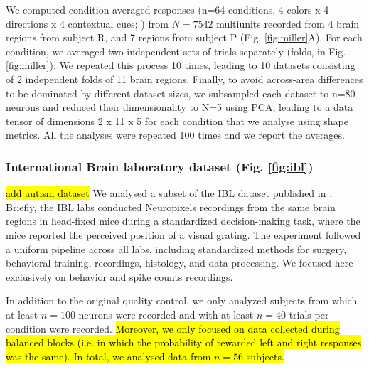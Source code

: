 We computed condition-averaged responses (n=64 conditions, 4 colors x 4 directions x 4 contextual cues; \cite{Siegel2015-cz}) from $N=7542$  multiunits recorded from 4 brain regions from subject R, and 7 regions from subject P (Fig. \ref{fig:miller}A). For each condition, we averaged two independent sets of trials separately (folds, in Fig. \ref{fig:miller}). We repeated this process 10 times, leading to 10 datasets consisting of 2 independent folds of 11 brain regions. Finally, to avoid across-area differences to be dominated by different dataset sizes, we subsampled each dataset to n=80 neurons and reduced their dimensionality to N=5 using PCA, leading to a data tensor of dimensions 2 x 11 x 5 for each condition that we analyse using shape metrics. All the analyses were repeated 100 times and we report the averages. 

\subsubsection{International Brain laboratory dataset (Fig. \ref{fig:ibl})}
\hl{add autism dataset}
We analysed a subset of the IBL dataset published in \cite{iblreproducibility}. Briefly, the IBL labs conducted Neuropixels recordings from the same brain regions in head-fixed mice during a standardized decision-making task, where the mice reported the perceived position of a visual grating. The experiment followed a uniform pipeline across all labs, including standardized methods for surgery, behavioral training, recordings, histology, and data processing. We focused here exclusively on behavior and spike counts recordings. 

In addition to the original quality control, we only analyzed subjects from which at least $n = 100$ neurons were recorded and with at least $n = 40$ trials per condition were recorded. \hl{Moreover, we only focused on data collected during balanced blocks (i.e. in which the probability of rewarded left and right responses was the same). In total, we analysed data from $n = 56$ subjects.}

